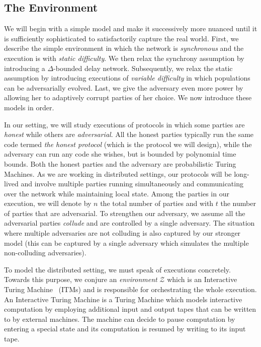 \subsection{The Environment}

We will begin with a simple model and make it successively more nuanced until it
is sufficiently sophisticated to satisfactorily capture the real world. First,
we describe the simple environment in which the network is \emph{synchronous}
and the execution is with \emph{static difficulty}. We then relax the synchrony
assumption by introducing a $\Delta$-bounded delay network. Subsequently, we
relax the static assumption by introducing executions of
\emph{variable difficulty} in which populations can be adversarially evolved.
Last, we give the adversary even more power by allowing her to adaptively
corrupt parties of her choice. We now introduce these models in order.

In our setting, we will study executions of protocols in which some parties
are \emph{honest} while others are \emph{adversarial}. All the honest parties
typically run the same code termed \emph{the honest protocol} (which is the
protocol we will design), while the adversary can run any code she wishes, but
is bounded by polynomial time bounds. Both the honest parties and the adversary
are probabilistic Turing Machines. As we are working in distributed settings,
our protocols will be long-lived and involve multiple parties running
simultaneously and communicating over the network while maintaining local state.
Among the parties in our execution, we will denote by $n$ the total number of
parties and with $t$ the number of parties that are adversarial. To strengthen
our adversary, we assume all the adversarial parties \emph{collude} and are
controlled by a single adversary. The situation where multiple adversaries are
not colluding is also captured by our stronger model (this can be captured by a
single adversary which simulates the multiple non-colluding adversaries).

To model the distributed setting, we must speak of executions concretely.
Towards this purpose, we conjure an \emph{environment} $\mathcal{Z}$
 which is an
Interactive Turing Machine~\cite{interactive-tm} (ITMs)  and is responsible for
orchestrating the whole execution. An Interactive Turing Machine is a Turing
Machine which models interactive computation by employing additional input and
output tapes that can be written to by external machines. The machine can decide
to pause computation by entering a special state and its computation is resumed
by writing to its input tape.

